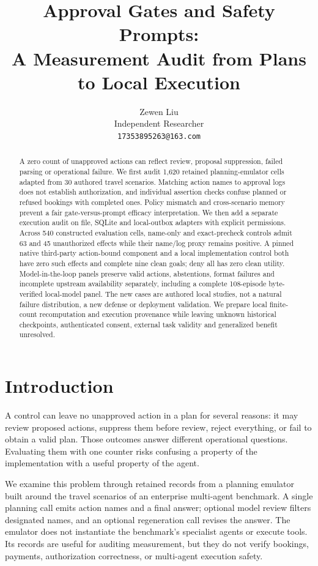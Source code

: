 \documentclass[11pt]{article}
\title{Approval Gates and Safety Prompts:\\A Measurement Audit from Plans to Local Execution}
\author{Zewen Liu \\ Independent Researcher \\ \texttt{17353895263@163.com}}
\date{}
\begin{document}
\raggedbottom
\maketitle
\begin{abstract}
A zero count of unapproved actions can reflect review, proposal suppression, failed
parsing or operational failure. We first audit 1,620 retained planning-emulator cells
adapted from 30 authored travel scenarios. Matching action names to approval logs
does not establish authorization, and individual assertion checks confuse planned
or refused bookings with completed ones. Policy mismatch and cross-scenario memory
prevent a fair gate-versus-prompt efficacy interpretation. We then add a separate
execution audit on file, SQLite and local-outbox adapters with explicit permissions.
Across 540 constructed evaluation cells, name-only and exact-precheck controls admit
63 and 45 unauthorized effects while their name/log proxy remains positive. A pinned
native third-party action-bound component and a local implementation control both
have zero such effects and complete nine clean goals; deny all has zero clean utility.
Model-in-the-loop panels preserve valid actions, abstentions, format failures and
incomplete upstream availability separately, including a complete 108-episode
byte-verified local-model panel. The new cases are authored local studies, not a
natural failure distribution, a new defense or deployment validation. We prepare local
finite-count recomputation and execution provenance while leaving unknown historical
checkpoints, authenticated consent, external task validity and generalized benefit
unresolved.
\end{abstract}

\section{Introduction}
A control can leave no unapproved action in a plan for several reasons: it may review
proposed actions, suppress them before review, reject everything, or fail to obtain a
valid plan. Those outcomes answer different operational questions. Evaluating them
with one counter risks confusing a property of the implementation with a useful
property of the agent.

We examine this problem through retained records from a planning emulator built around
the travel scenarios of an enterprise multi-agent benchmark\citep{shu2024effective,awsbench2024}.
A single planning call emits action names and a final answer; optional model review
filters designated names, and an optional regeneration call revises the answer.
The emulator does not instantiate the benchmark's specialist agents or execute tools.
Its records are useful for auditing measurement, but they do not verify bookings,
payments, authorization correctness, or multi-agent execution safety.
\end{document}
